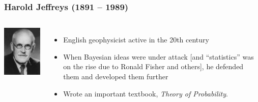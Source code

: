 \documentclass{beamer}
\begin{document}
\begin{frame}
\frametitle{Harold Jeffreys (1891 -- 1989)}

    \begin{columns} %
        \includegraphics[width=1\linewidth]{images/jeffreys.jpg}

        \begin{itemize}
        \item English geophysicist active in the 20th century\pause
        \item When Bayesian ideas were under attack [and ``statistics'' was
              on the rise due to Ronald Fisher and others], he defended them
              and developed them further\pause
        \item Wrote an important textbook, {\em Theory of Probability}.
        \end{itemize}
     \end{columns}

\end{frame}
\end{document}
